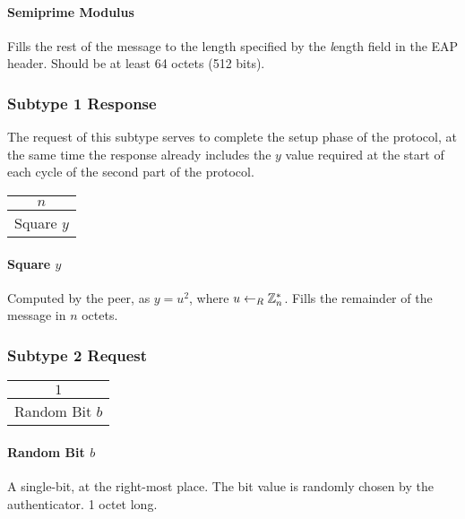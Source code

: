 \paragraph{Semiprime Modulus}
Fills the rest of the message to the length specified by the \textit length field in the EAP header. %
Should be at least 64 octets (512 bits).


\subsubsection{Subtype 1 Response}
The request of this subtype serves to complete the setup phase of the protocol, at the same time the response already includes the $y$ value required at the start of each cycle of the second part of the protocol.

\begin{center}
\begin{tabular}{|c|}
	\hline
	$n$ \\
	\hline
	Square $y$\\
	\hline
\end{tabular}
\end{center}

\bigskip

\paragraph{Square $y$} Computed by the peer, as $y = u^2$, where $u \leftarrow_R \Bbb{Z}_{n}^{*}$. Fills the remainder of the message in $n$ octets.

\subsubsection{Subtype 2 Request}

\begin{center}
\begin{tabular}{|c|}
	\hline
	$1$ \\
	\hline
	Random Bit $b$\\
	\hline
\end{tabular}
\end{center}

\paragraph{Random Bit $b$} A single-bit, at the right-most place. The bit value is randomly chosen by the authenticator. 1 octet long.

